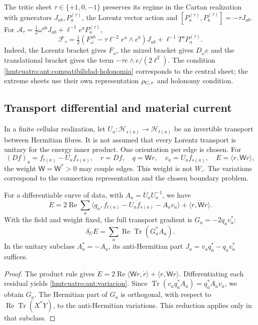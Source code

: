 The tritic sheet \(\tau\in\{+1,0,-1\}\) preserves its regime in the Cartan realization with generators \(J_{ab},P_a^{(\tau)}\), the Lorentz vector action and \([P_a^{(\tau)},P_b^{(\tau)}]=-\tau J_{ab}\). For \(\mathcal A_\tau=\frac12\omega^{ab}J_{ab}+\ell^{-1}e^aP_a^{(\tau)}\),
\[
 \mathcal F_\tau=
 \tfrac12(F_\omega^{ab}-\tau\ell^{-2}e^a\wedge e^b)J_{ab}
 +\ell^{-1}T^aP_a^{(\tau)} .
\]
Indeed, the Lorentz bracket gives \(F_\omega\), the mixed bracket gives \(D_\omega e\) and the translational bracket gives the term \(-\tau e\wedge e/(2\ell^2)\). The condition \eqref{hmtcuatro:ant:compatibilidad-holonomia} corresponds to the central sheet; the extreme sheets use their own representation \(\rho_{{\rm C},\tau}\) and holonomy condition.

\subsection{Transport differential and material current}
\label{hmtcuatro:ant:corriente-transporte}

In a finite cellular realization, let \(U_a:\mathcal H_{s(a)}\to\mathcal H_{t(a)}\) be an invertible transport between Hermitian fibres. It is not assumed that every Lorentz transport is unitary for the energy inner product. One orientation per edge is chosen. For
\[
 (Df)_a=f_{t(a)}-U_af_{s(a)},\quad r=Df,\quad
 q=\mathsf W r,\quad v_a=U_af_{s(a)},\quad
 E=\langle r,\mathsf W r\rangle ,
\]
the weight \(\mathsf W=\mathsf W^*>0\) may couple edges. This weight is not \(W_\square\). The variations correspond to the connection representation and the chosen boundary problem.

\begin{proposition}
\label{hmtcuatro:ant:variacion-completa} For a differentiable curve of data, with \(A_a=\dot U_aU_a^{-1}\), we have
\begin{equation}
 \dot E=2\operatorname{Re}\sum_a
 \langle q_a,\dot f_{t(a)}-U_a\dot f_{s(a)}-A_av_a\rangle
 +\langle r,\dot{\mathsf W}r\rangle .
 \label{hmtcuatro:ant:variacion}
\end{equation}
With the field and weight fixed, the full transport gradient is \(G_a=-2q_av_a^*\):
\[
 \delta_U E=\sum_a\operatorname{Re}\operatorname{Tr}(G_a^*A_a).
\]
In the unitary subclass \(A_a^*=-A_a\), its anti-Hermitian part \(J_a=v_aq_a^*-q_av_a^*\) suffices.
\end{proposition}
\begin{proof}
The product rule gives \(\dot E=2\operatorname{Re}\langle\mathsf W r,\dot r\rangle+
\langle r,\dot{\mathsf W}r\rangle\). Differentiating each residual yields \eqref{hmtcuatro:ant:variacion}. Since \(\operatorname{Tr}(v_aq_a^*A_a)=q_a^*A_av_a\), we obtain \(G_a\). The Hermitian part of \(G_a\) is orthogonal, with respect to \(\operatorname{Re}\operatorname{Tr}(X^*Y)\), to the anti-Hermitian variations. This reduction applies only in that subclass.
\end{proof}

